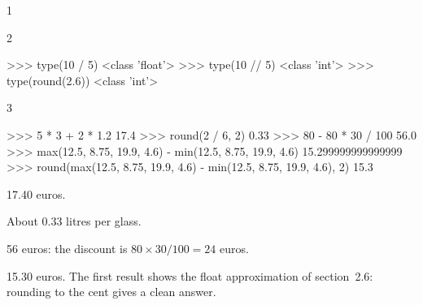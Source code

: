 \begin{corrige}{1}
\begin{reponses}[4]
\item {}
\item {}
\item {}
\item {}
\item {}
\item {}
\item {}
\item {}
\end{reponses}
\end{corrige}

\begin{corrige}{2}
\begin{reponses}[4]
\item {}
\item {}
\item {}
\item {}
\item {}
\item {}
\item {}
\item {}
\end{reponses}
\begin{console}
>>> type(10 / 5)
<class 'float'>
>>> type(10 // 5)
<class 'int'>
>>> type(round(2.6))
<class 'int'>
\end{console}
\end{corrige}

\begin{corrige}{3}
\begin{console}
>>> 5 * 3 + 2 * 1.2
17.4
>>> round(2 / 6, 2)
0.33
>>> 80 - 80 * 30 / 100
56.0
>>> max(12.5, 8.75, 19.9, 4.6) - min(12.5, 8.75, 19.9, 4.6)
15.299999999999999
>>> round(max(12.5, 8.75, 19.9, 4.6) - min(12.5, 8.75, 19.9, 4.6), 2)
15.3
\end{console}
\begin{reponses}
\item 17.40 euros.
\item About 0.33 litres per glass.
\item 56 euros: the discount is $80 \times 30 / 100 = 24$ euros.
\item 15.30 euros. The first result shows the float approximation of section~2.6: rounding to the
  cent gives a clean answer.
\end{reponses}
\end{corrige}


